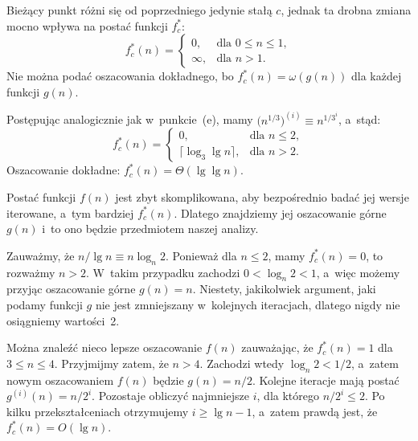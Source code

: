 \subproblem %
Bieżący punkt różni się od poprzedniego jedynie stałą $c$, jednak ta drobna zmiana mocno wpływa na postać funkcji $f_c^*$:
\[
	f_c^*(n) =
	\begin{cases}
		0, & \text{dla $0\le n\le1$}, \\
		\infty, & \text{dla $n>1$}.
	\end{cases}
\]
Nie można podać oszacowania dokładnego, bo $f_c^*(n)=\omega(g(n))$ dla każdej funkcji $g(n)$.

\subproblem %
Postępując analogicznie jak w~punkcie~(e), mamy $\bigl(n^{1/3}\bigr)^{(i)}\equiv n^{1/3^i}$, a~stąd:
\[
	f_c^*(n) =
	\begin{cases}
		0, & \text{dla $n\le2$}, \\
		\lceil\log_3\lg n\rceil, & \text{dla $n>2$}.
	\end{cases}
\]
Oszacowanie dokładne: $f_c^*(n)=\Theta(\lg\lg n)$.

\subproblem %
Postać funkcji $f(n)$ jest zbyt skomplikowana, aby bezpośrednio badać jej wersje iterowane, a~tym bardziej $f_c^*(n)$. Dlatego znajdziemy jej oszacowanie górne $g(n)$ i~to ono będzie przedmiotem naszej analizy.

Zauważmy, że $n/\!\lg n\equiv n\log_n\!2$. Ponieważ dla $n\le2$, mamy $f_c^*(n)=0$, to rozważmy $n>2$. W~takim przypadku zachodzi $0<\log_n\!2<1$, a~więc możemy przyjąc oszacowanie górne $g(n)=n$. Niestety, jakikolwiek argument, jaki podamy funkcji $g$ nie jest zmniejszany w~kolejnych iteracjach, dlatego nigdy nie osiągniemy wartości~2.

Można znaleźć nieco lepsze oszacowanie $f(n)$ zauważając, że $f_c^*(n)=1$ dla $3\le n\le4$. Przyjmijmy zatem, że $n>4$. Zachodzi wtedy $\log_n\!2<1/2$, a~zatem nowym oszacowaniem $f(n)$ będzie $g(n)=n/2$. Kolejne iteracje mają postać $g^{(i)}(n)=n/2^i$. Pozostaje obliczyć najmniejsze $i$, dla którego $n/2^i\le2$. Po kilku przekształceniach otrzymujemy $i\ge\lg n-1$, a~zatem prawdą jest, że $f_c^*(n)=O(\lg n)$.

\endinput
